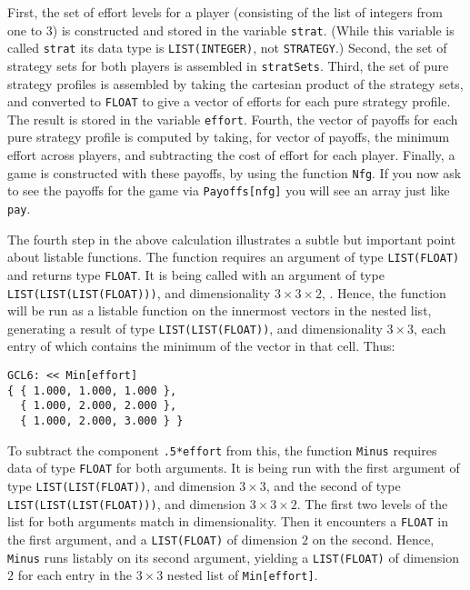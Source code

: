 First, the set of effort levels for a player (consisting of the list
of integers from one to 3) is constructed and stored in the variable
\verb+strat+.  (While this variable is called \verb+strat+ its data
type is \verb+LIST(INTEGER)+, not \verb+STRATEGY+.)  Second, the set
of strategy sets for both players is assembled in \verb+stratSets+.
Third, the set of pure strategy profiles is assembled by taking the
cartesian product of the strategy sets, and converted to \verb+FLOAT+
to give a vector of efforts for each pure strategy profile.  The
result is stored in the variable \verb+effort+.  Fourth, the vector of
payoffs for each pure strategy profile is computed by taking, for
vector of payoffs, the minimum effort across players, and subtracting
the cost of effort for each player.  Finally, a game is constructed
with these payoffs, by using the function \verb+Nfg+.  If you now ask
to see the payoffs for the game via \verb+Payoffs[nfg]+ you will see
an array just like \verb+pay+.  

The fourth step in the above calculation illustrates a subtle but
important point about listable functions.  The function 
requires an argument of type \verb+LIST(FLOAT)+ and returns type
\verb+FLOAT+.  It is being called with an argument of type
\verb+LIST(LIST(LIST(FLOAT)))+, and dimensionality $3\times 3\times
2$, .  Hence, the function will be run as a listable function on the
innermost vectors in the nested list, generating a result of type
\verb+LIST(LIST(FLOAT))+, and dimensionality $3\times 3$, each entry
of which contains the minimum of the vector in that cell.  Thus:

\begin{verbatim}
GCL6: << Min[effort]
{ { 1.000, 1.000, 1.000 },
  { 1.000, 2.000, 2.000 },
  { 1.000, 2.000, 3.000 } }
\end{verbatim}

\noindent
To subtract the component \verb+.5*effort+ from this, the function
\verb+Minus+ requires data of type \verb+FLOAT+ for both arguments.
It is being run with the first argument of type
\verb+LIST(LIST(FLOAT))+, and dimension $3\times 3$, and the second of
type \verb+LIST(LIST(LIST(FLOAT)))+, and dimension $3\times 3\times
2$.  The first two levels of the list for both arguments match
in dimensionality.  Then it encounters a \verb+FLOAT+ in the first
argument, and a \verb+LIST(FLOAT)+ of dimension $2$ on the second.
Hence, \verb+Minus+ runs listably on its second argument, yielding a
\verb+LIST(FLOAT)+ of dimension $2$ for each entry in the $3\times 3$
nested list of \verb+Min[effort]+. 

